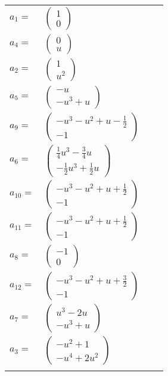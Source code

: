 \documentclass[1p]{elsarticle_modified}
\theoremstyle{definition}
\begin{document}
\begin{tabular}{m{7pt} m{180pt} m{7pt} m{180pt} }
\flushright $a_{1}=$&$\begin{pmatrix}1\\0\end{pmatrix}$ \\
\flushright $a_{4}=$&$\begin{pmatrix}0\\u\end{pmatrix}$ \\
\flushright $a_{2}=$&$\begin{pmatrix}1\\u^2\end{pmatrix}$ \\
\flushright $a_{5}=$&$\begin{pmatrix}- u\\- u^3+u\end{pmatrix}$ \\
\flushright $a_{9}=$&$\begin{pmatrix}- u^3- u^2+u-\frac{1}{2}\\-1\end{pmatrix}$ \\
\flushright $a_{6}=$&$\begin{pmatrix}\frac{1}{4} u^3-\frac{3}{4} u\\-\frac{1}{2} u^3+\frac{1}{2} u\end{pmatrix}$ \\
\flushright $a_{10}=$&$\begin{pmatrix}- u^3- u^2+u+\frac{1}{2}\\-1\end{pmatrix}$ \\
\flushright $a_{11}=$&$\begin{pmatrix}- u^3- u^2+u+\frac{1}{2}\\-1\end{pmatrix}$ \\
\flushright $a_{8}=$&$\begin{pmatrix}-1\\0\end{pmatrix}$ \\
\flushright $a_{12}=$&$\begin{pmatrix}- u^3- u^2+u+\frac{3}{2}\\-1\end{pmatrix}$ \\
\flushright $a_{7}=$&$\begin{pmatrix}u^3-2 u\\- u^3+u\end{pmatrix}$ \\
\flushright $a_{3}=$&$\begin{pmatrix}- u^2+1\\- u^4+2 u^2\end{pmatrix}$\\&\end{tabular}
\end{document}
